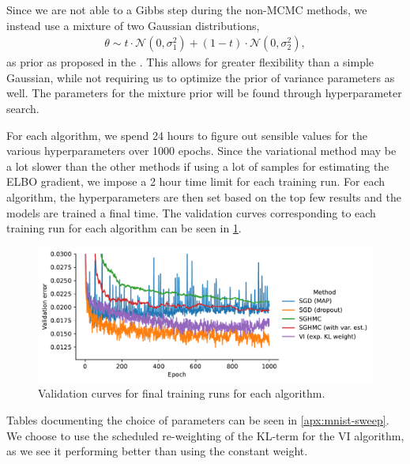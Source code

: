 Since we are not able to a Gibbs step during the non-MCMC methods, we instead use a mixture of two Gaussian distributions,
\begin{align}
    \theta \sim t\cdot \mathcal{N}(0, \sigma_1^2) + (1-t)\cdot \mathcal{N}(0, \sigma_2^2),
\end{align}
as prior as proposed in the \cite{blundell_weight_2015}.
This allows for greater flexibility than a simple Gaussian, while not requiring us to optimize the prior of variance parameters as well.
The parameters for the mixture prior will be found through hyperparameter search.

For each algorithm, we spend 24 hours to figure out sensible values for the various hyperparameters over 1000 epochs. 
Since the variational method may be a lot slower than the other methods if using a lot of samples for estimating the ELBO gradient, we impose a 2 hour time limit for each training run. 
For each algorithm, the hyperparameters are then set based on the top few results and the models are trained a final time.
The validation curves corresponding to each training run for each algorithm can be seen in \cref{fig:mnist-best-val-curves}.
\begin{figure}[htbp]
    \centering
    \includegraphics[width=\linewidth]{Figures/mnist-final-runs-val.pdf}
    \caption{Validation curves for final training runs for each algorithm.}
    \label{fig:mnist-best-val-curves}
\end{figure}
Tables documenting the choice of parameters can be seen in \cref{apx:mnist-sweep}.
We choose to use the scheduled re-weighting of the KL-term for the VI algorithm, as we see it performing better than using the constant weight.

